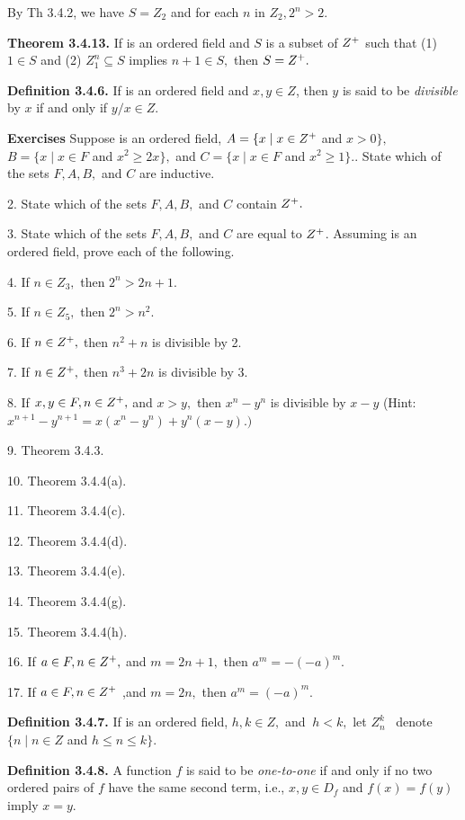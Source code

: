 \begin{large}
By Th 3.4.2, we have $S=Z_{2}$ and for each $n$ in $Z_{2}, 2^{n} > 2.$\nl

\textbf{Theorem 3.4.13.} If \of  is an ordered field and $S$ is a subset of $Z^{+}$ such that (1) $1\in S$ and (2) $Z^{n}_{1} \subseteq S$ implies $n+1\in S,$ then $S = Z^{+}.$\nl

\textbf{Definition 3.4.6.} If \of is an ordered field and $x,y\in Z$, then $y$ is said to be \textit{divisible} by $x$ if and only if $y / x \in Z.$\nl

\textbf{Exercises}\nl
Suppose \of  is an ordered field, $A =\{x \mid x\in Z^{+}$ and $x > 0\},$\nl $B= \{x \mid x\in F$  and $x^{2}\geq  2x\},$ and $C =\{x \mid x\in F$ and $x^{2} \geq 1\}.$. State which of the sets $F, A, B,$ and $C$ are inductive. \nl

2. State which of the sets $F, A, B,$ and $C$ contain $Z^{+} .$\nl

3. State which of the sets $F, A, B,$ and $C$ are equal to $Z^{+}$. \nl
Assuming  \of is an ordered field, prove each of the following.

4. If $n\in Z_{3},$ then $2^{n} > 2n + 1. $\nl

5. If $n\in Z_{5},$ then $2^{n} > n^{2}.$\nl

6. If $n\in Z^{+},$ then $n^{2} + n$ is divisible by 2.\nl

7. If $n\in Z^{+},$ then $n^{3}+ 2n$ is divisible by 3.\nl

8. 	If $x,y\in F, n\in Z^{+},$ and $x > y,$ then $x^{n} - y^{n}$ is divisible by $x - y$\nl
 (Hint: $x^{n+1} - y^{n+1} = x(x^{n} -y^{n} ) + y^{n}(x-y).) $\nl

9. Theorem 3.4.3.

10. Theorem 3.4.4(a).

11. Theorem 3.4.4(c).

12. Theorem 3.4.4(d).

\newpage


13. Theorem 3.4.4(e).\nl

14. Theorem 3.4.4(g).\nl

15. Theorem 3.4.4(h).\nl

16. If $a\in F, n\in Z^{+},$ and $ m = 2n + 1,$ then $a^{m} = -(-a)^{m}.$ \nl

17. If $a\in F, n\in Z^{+}$ ,and $m = 2n,$ then $a^{m} =(-a)^{m}.$ \nl


\textbf{Definition 3.4.7.} If \of is an ordered field, $h,k\in Z,$ and $~h < k,$  let $Z^{k}_{n}$~ denote $\{n \mid n\in Z$ and  $h\leq n\leq k\}.$\nl

\textbf{Definition 3.4.8.} A function $f$ is said to be \textit{one-to-one} if and only if no two ordered pairs of $f$
have the same second term, i.e., $x,y\in D_{f} $ and $f(x)= f(y) $ imply $x=y.$\nl


\end{large}
